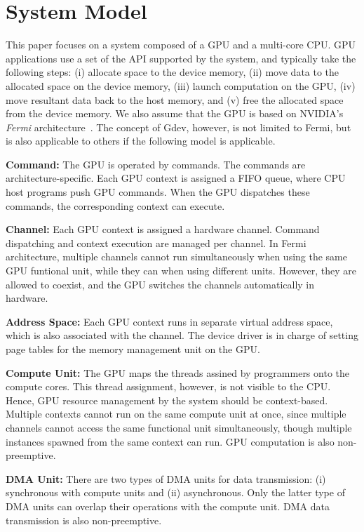 \section{System Model}
\label{sec:model}

This paper focuses on a system composed of a GPU and a multi-core CPU.
GPU applications use a set of the API supported by the system, and
typically take the following steps:
(i) allocate space to the device memory, 
(ii) move data to the allocated space on the device memory, 
(iii) launch computation on the GPU, 
(iv) move resultant data back to the host memory, and 
(v) free the allocated space from the device memory.
We also assume that the GPU is based on NVIDIA's \textit{Fermi}
architecture~\cite{Fermi}.
The concept of Gdev, however, is not limited to Fermi, but is also
applicable to others if the following model is applicable.

\textbf{Command:}
The GPU is operated by commands.
The commands are architecture-specific.
Each GPU context is assigned a FIFO queue, where CPU host programs push
GPU commands.
When the GPU dispatches these commands, the corresponding context can
execute. 

\textbf{Channel:}
Each GPU context is assigned a hardware channel.
Command dispatching and context execution are managed per channel.
In Fermi architecture, multiple channels cannot run simultaneously when
using the same GPU funtional unit, while they can when using different
units.
However, they are allowed to coexist, and the GPU switches the channels
automatically in hardware.

\textbf{Address Space:}
Each GPU context runs in separate virtual address space, which is also
associated with the channel.
The device driver is in charge of setting page tables for the memory
management unit on the GPU.

\begin{comment}
\textbf{I/O Register:}
The GPU provides a bunch of memory-mapped I/O registers per context
visible to the device driver through the (PCI) I/O bus.
The device driver needs to manage these registers to send commands and
set up channels and address space.
\end{comment}

\textbf{Compute Unit:}
The GPU maps the threads assined by programmers onto the compute cores.
This thread assignment, however, is not visible to the CPU.
Hence, GPU resource management by the system should be
context-based. 
Multiple contexts cannot run on the same compute unit at once, since
multiple channels cannot access the same functional unit simultaneously,
though multiple instances spawned from the same context can run.
GPU computation is also non-preemptive.

\textbf{DMA Unit:}
There are two types of DMA units for data transmission: (i) synchronous
with compute units and (ii) asynchronous.
Only the latter type of DMA units can overlap their operations with the
compute unit.
DMA data transmission is also non-preemptive.
